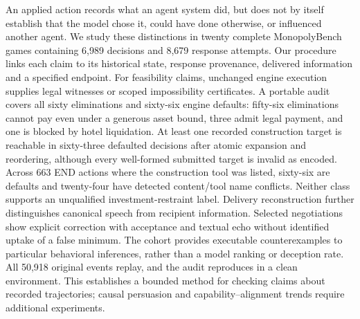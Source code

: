 An applied action records what an agent system did, but does not by itself establish that the model chose it, could have done otherwise, or influenced another agent. We study these distinctions in twenty complete MonopolyBench games containing 6,989 decisions and 8,679 response attempts. Our procedure links each claim to its historical state, response provenance, delivered information and a specified endpoint. For feasibility claims, unchanged engine execution supplies legal witnesses or scoped impossibility certificates. A portable audit covers all sixty eliminations and sixty-six engine defaults: fifty-six eliminations cannot pay even under a generous asset bound, three admit legal payment, and one is blocked by hotel liquidation. At least one recorded construction target is reachable in sixty-three defaulted decisions after atomic expansion and reordering, although every well-formed submitted target is invalid as encoded. Across 663 END actions where the construction tool was listed, sixty-six are defaults and twenty-four have detected content/tool name conflicts. Neither class supports an unqualified investment-restraint label. Delivery reconstruction further distinguishes canonical speech from recipient information. Selected negotiations show explicit correction with acceptance and textual echo without identified uptake of a false minimum. The cohort provides executable counterexamples to particular behavioral inferences, rather than a model ranking or deception rate. All 50,918 original events replay, and the audit reproduces in a clean environment. This establishes a bounded method for checking claims about recorded trajectories; causal persuasion and capability--alignment trends require additional experiments.
